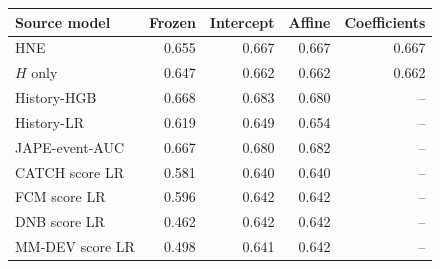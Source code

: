 \begin{tabular*}{\linewidth}{@{\extracolsep{\fill}}lrrrr@{}}
\toprule
Source model & Frozen & Intercept & Affine & Coefficients \\
\midrule
HNE & 0.655 & 0.667 & 0.667 & 0.667 \\
$H$ only & 0.647 & 0.662 & 0.662 & 0.662 \\
History-HGB & 0.668 & 0.683 & 0.680 & -- \\
History-LR & 0.619 & 0.649 & 0.654 & -- \\
JAPE-event-AUC & 0.667 & 0.680 & 0.682 & -- \\
CATCH score LR & 0.581 & 0.640 & 0.640 & -- \\
FCM score LR & 0.596 & 0.642 & 0.642 & -- \\
DNB score LR & 0.462 & 0.642 & 0.642 & -- \\
MM-DEV score LR & 0.498 & 0.641 & 0.642 & -- \\
\bottomrule
\end{tabular*}